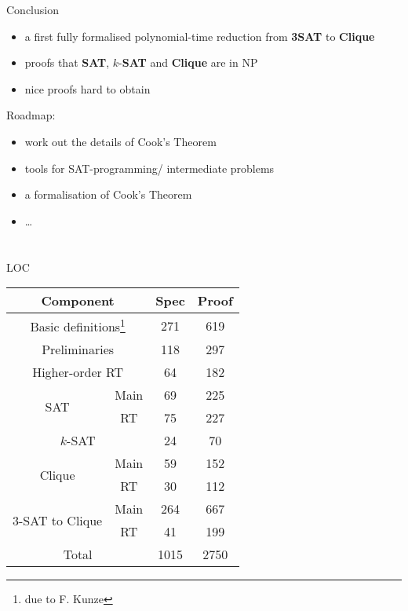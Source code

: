 \documentclass[11pt,usenames,dvipsnames,
  hyperref={pdfencoding=auto,psdextra}]{beamer}
\makeatletter
\def\beamer@writeslidentry@miniframesoff{%
  \expandafter\beamer@ifempty\expandafter{\beamer@framestartpage}{}%
  {%
    \clearpage\beamer@notesactions%
  }
}
\newcommand*{\miniframesoff}{\let\beamer@writeslidentry=\beamer@writeslidentry@miniframesoff}
\makeatother
\begin{document}


\begin{frame}{Conclusion}
  \begin{itemize}
    \item a first fully formalised polynomial-time reduction from \textbf{3SAT} to \textbf{Clique}
    \item proofs that \textbf{SAT}, $k$-\textbf{SAT} and \textbf{Clique} are in NP
    \item nice proofs hard to obtain
  \end{itemize}

  \vspace{5ex}

  Roadmap:
  \begin{itemize}
    \item work out the details of Cook's Theorem
    \item tools for SAT-programming/ intermediate problems
    \item a formalisation of Cook's Theorem
    \item \ldots 
  \end{itemize}
\end{frame}

\miniframesoff
\section{}


\begin{frame}{LOC}
  \begin{center}
  \begin{tabular}{cccc}
    \multicolumn{2}{c}{Component} & Spec & Proof \\
    \midrule
    \multicolumn{2}{c}{Basic definitions\footnote{due to F. Kunze}} & 271 & 619\\
    \multicolumn{2}{c}{Preliminaries} & 118 & 297 \\
    \multicolumn{2}{c}{Higher-order RT} & 64 & 182 \\
    \midrule
    \multirow{2}{*}{SAT} & Main & 69 & 225 \\
    & RT & 75 & 227 \\
    \midrule
    \multicolumn{2}{c}{$k$-SAT} & 24 & 70 \\
    \midrule
    \multirow{2}{*}{Clique} & Main & 59 & 152 \\
    & RT & 30 & 112 \\
    \midrule
    \multirow{2}{*}{3-SAT to Clique} & Main & 264 & 667 \\
    & RT & 41 & 199\\
    \midrule
    \multicolumn{2}{c}{Total} & 1015 & 2750

  \end{tabular}
  \end{center}
\end{frame}
\end{document}
